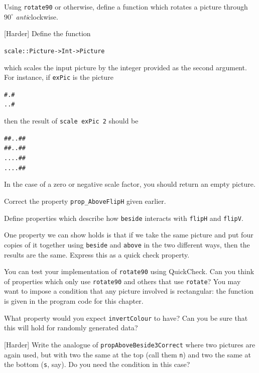 \begin{exercises}
\item
Using \texttt{rotate90} or otherwise, define a function which rotates a picture through
$90^\circ$ {\em anti}clockwise.

\item
{[Harder]} Define the function
\begin{alltt}
scale :: Picture -> Int -> Picture
\end{alltt}
which scales the input picture by the integer provided as the second
argument. For instance, if \texttt{exPic} is the picture
\begin{alltt}
#.#
..#
\end{alltt}
then the result of \texttt{scale exPic 2} should be
\begin{alltt}
##..##
##..##
....##
....##
\end{alltt}
In the case of a zero or negative scale factor, you should
return an empty picture.


\item
Correct the property \texttt{prop\_AboveFlipH} given earlier.

\item
Define properties which describe how \texttt{beside} interacts with \texttt{flipH} and \texttt{flipV}.

\item
One property we can show holds is that if we take the same picture and put four copies of it together using \texttt{beside} and \texttt{above} in the two different ways, then the results are the same. Express this as a quick check property.

\item
You can test your implementation of \texttt{rotate90} using QuickCheck. Can you think of properties which only use \texttt{rotate90} and others that use \texttt{rotate}? You may want to impose a condition that any picture involved is rectangular: the function is given in the program code for this chapter.

\item
What property would you expect \texttt{invertColour} to have? Can you be sure that this will hold for randomly generated data?

\item {[Harder]}
Write the analogue of \texttt{propAboveBeside3Correct} where two pictures are again used, but with two the same at the top (call them \texttt{n}) and two the same at the bottom (\texttt{s}, say). Do you need the condition in this case?







\end{exercises}
 





